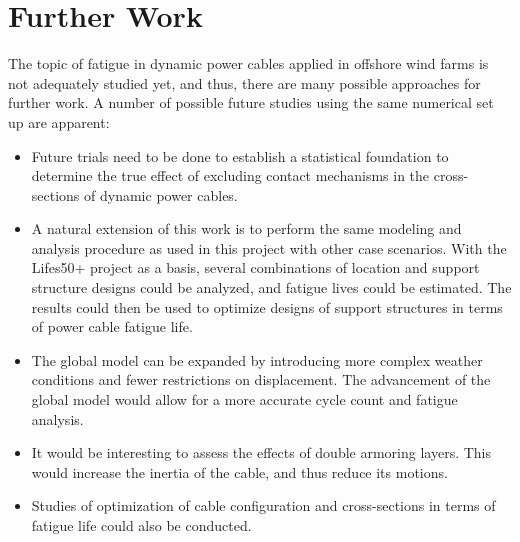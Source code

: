 \section{Further Work}
The topic of fatigue in dynamic power cables applied in offshore wind farms is not adequately studied yet, and thus, there are many possible approaches for further work. A number of possible future studies using the same numerical set up are apparent: 
\begin{itemize}
    \item Future trials need to be done to establish a statistical foundation to determine the true effect of excluding contact mechanisms in the cross-sections of dynamic power cables.  
    \item A natural extension of this work is to perform the same modeling and analysis procedure as used in this project with other case scenarios. With the Lifes50+ project as a basis, several combinations of location and support structure designs could be analyzed, and fatigue lives could be estimated. The results could then be used to optimize designs of support structures in terms of power cable fatigue life.  
    \item The global model can be expanded by introducing more complex weather conditions and fewer restrictions on displacement. The advancement of the global model would allow for a more accurate cycle count and fatigue analysis.  
    \item It would be interesting to assess the effects of double armoring layers. This would increase the inertia of the cable, and thus reduce its motions.
    \item Studies of optimization of cable configuration and cross-sections in terms of fatigue life could also be conducted. 
\end{itemize}

  
